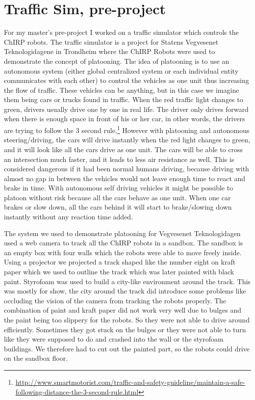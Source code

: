 \section{Traffic Sim, pre-project}
\label{sec:prepro}
For my master's pre-project I worked on a traffic simulator which controls the ChIRP robots.
The traffic simulator is a project for Statens Vegvesenet Teknologidagene in Trondheim where the ChIRP Robots were used to demonstrate the concept of platooning. 
The idea of platooning is to use an autonomous system (either global centralized system or each individual entity communicates with each other) to control the vehicles as one unit thus increasing the flow of traffic. These vehicles can be anything, but in this case we imagine them being cars or trucks found in traffic. When the red traffic light changes to green, drivers usually drive one by one in real life. The driver only drives forward when there is enough space in front of his or her car, in other words, the drivers are trying to follow the 3 second rule.\footnote{\href{http://www.smartmotorist.com/traffic-and-safety-guideline/maintain-a-safe-following-distance-the-3-second-rule.html}{http://www.smartmotorist.com/traffic-and-safety-guideline/maintain-a-safe-following-distance-the-3-second-rule.html}}
However with platooning and autonomous steering/driving, the cars will drive instantly when the red light changes to green, and it will look like all the cars drive as one unit. The cars will be able to cross an intersection much faster, and it leads to less air resistance as well. This is considered dangerous if it had been normal humans driving, because driving with almost no gap in between the vehicles would not leave enough time to react and brake in time. With autonomous self driving vehicles it might be possible to platoon without risk because all the cars behave as one unit. When one car brakes or slow down, all the cars behind it will start to brake/slowing down instantly without any reaction time added.

The system we used to demonstrate platooning for Vegvesenet Teknologidagen used a web camera to track all the ChIRP robots in a sandbox. The sandbox is an empty box with four walls which the robots were able to move freely inside. Using a projector we projected a track shaped like the number eight on kraft paper which we used to outline the track which was later painted with black paint. Styrofoam was used to build a city-like environment around the track. This was mostly for show, the city around the track did introduce some problems like occluding the vision of the camera from tracking the robots properly. The combination of paint and kraft paper did not work very well due to bulges and the paint being too slippery for the robots. So they were not able to drive around efficiently. Sometimes they got stuck on the bulges or they were not able to turn like they were supposed to do and crashed into the wall or the styrofoam buildings.  We therefore had to cut out the painted part, so the robots could drive on the sandbox floor.

